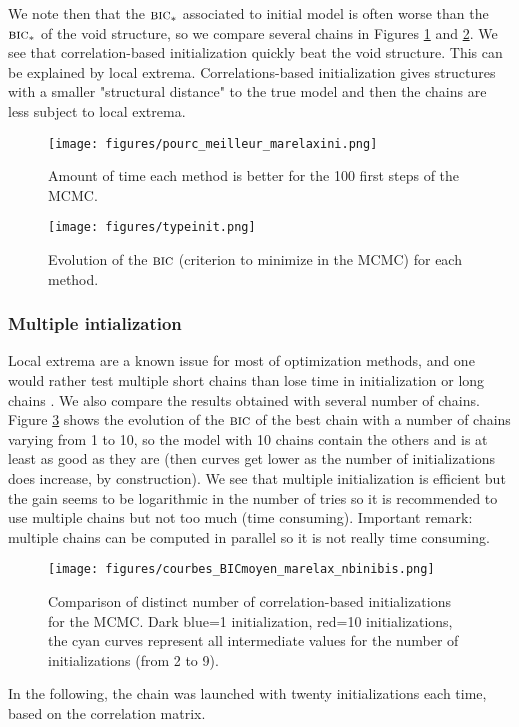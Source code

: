 \documentclass[12pt,a4paper]{report}
\begin{document}
		We note then that the $\mbox{{\sc bic}}_*$ associated to initial model is often worse than the $\mbox{{\sc bic}}_*$ of the void structure, so we compare several chains in Figures \ref{pourcini} and \ref{Bicini}.			
				We see that correlation-based initialization quickly beat the void structure. This can be explained by local extrema. Correlations-based initialization gives structures with a smaller "structural distance" to the true model and then the chains are less subject to local extrema.

	\begin{center}
		\begin{figure}[h!]
		\centering
		\texttt{[image: figures/pourc\_meilleur\_marelaxini.png]} 
		\caption{Amount of time each method is better for the 100 first steps of the MCMC. } \label{pourcini}
		\end{figure}		
	\end{center}
	
	\begin{center}
		\begin{figure}[h!]
		\centering
		\texttt{[image: figures/typeinit.png]} %
		\caption{Evolution of the $\mbox{{\sc bic}}$ (criterion to minimize in the MCMC) for each method.}\label{Bicini}
		\end{figure}
	\end{center}
	\FloatBarrier
		\subsubsection{Multiple intialization}	
		Local extrema are a known issue for most of optimization methods, and one would rather test multiple short chains than lose time in initialization or long chains \cite{gilks1996markov}. 
		We also compare the results obtained with several number of chains. Figure \ref{nbini} shows the evolution of the $\mbox{{\sc bic}}$ of the best chain with a number of chains varying from 1 to 10, so the model with 10 chains contain the others and is at least as good as they are (then curves get lower as the number of initializations does increase, by construction). We see that multiple initialization is efficient but the gain seems to be logarithmic in the number of tries so it is recommended to use multiple chains but not too much (time consuming). Important remark: multiple chains can be computed in parallel so it is not really time consuming.		
			
	\begin{center}
	\begin{figure}[h!]
	\centering
		\texttt{[image: figures/courbes\_BICmoyen\_marelax\_nbinibis.png]} 
		\caption{Comparison of distinct number of correlation-based initializations for the MCMC. Dark blue=1 initialization, red=10 initializations, the cyan curves represent all intermediate values for the number of initializations (from 2 to 9).}\label{nbini}
	\end{figure}
	\end{center}
		In the following, the chain was launched with twenty initializations each time, based on the correlation matrix.
\end{document}
